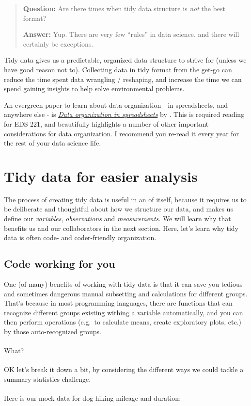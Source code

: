 \documentclass[
]{book}
\begin{document}
\begin{quote}
\textbf{Question:} Are there times when tidy data structure is \emph{not} the best format?

\textbf{Answer:} Yup. There are very few ``rules'' in data science, and there will certainly be exceptions.
\end{quote}

Tidy data gives us a predictable, organized data structure to strive for (unless we have good reason not to). Collecting data in tidy format from the get-go can reduce the time spent data wrangling / reshaping, and increase the time we can spend gaining insights to help solve environmental problems.

An evergreen paper to learn about data organization - in spreadsheets, and anywhere else - is \href{https://www-tandfonline-com.proxy.library.ucsb.edu:9443/doi/full/10.1080/00031305.2017.1375989}{\emph{Data organization in spreadsheets}} by \citet{broman_data_2018}. This is required reading for EDS 221, and beautifully highlights a number of other important considerations for data organization. I recommend you re-read it every year for the rest of your data science life.

\hypertarget{tidy-data-for-easier-analysis}{%
\section{Tidy data for easier analysis}\label{tidy-data-for-easier-analysis}}

The process of creating tidy data is useful in an of itself, because it requires us to be deliberate and thoughtful about how we structure our data, and makes us define our \emph{variables}, \emph{observations} and \emph{measurements}. We will learn why that benefits us and our collaborators in the next section. Here, let's learn why tidy data is often code- and coder-friendly organization.

\hypertarget{code-working-for-you}{%
\subsection{Code working for you}\label{code-working-for-you}}

One (of many) benefits of working with tidy data is that it can save you tedious and sometimes dangerous manual subsetting and calculations for different groups. That's because in most programming languages, there are functions that can recognize different groups existing withing a variable automatically, and you can then perform operations (e.g.~to calculate means, create exploratory plots, etc.) by those auto-recognized groups.\\
~\\
What?\\
~\\
OK let's break it down a bit, by considering the different ways we could tackle a summary statistics challenge.\\
~\\
Here is our mock data for dog hiking mileage and duration:
\end{document}
